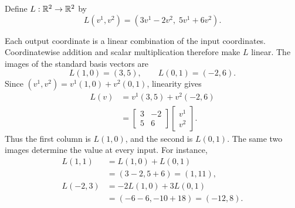 \begin{example}
  \label{ex:linear-algebra-i:coordinate-rule-matrix-columns}
  Define \(L:\mathbb{R}^2\to\mathbb{R}^2\) by
  \[
    L(v^1,v^2)=(3v^1-2v^2,\;5v^1+6v^2).
  \]
  \begin{pendingreview}
  Each output coordinate is a linear combination of the input coordinates.
  Coordinatewise addition and scalar multiplication therefore make \(L\)
  linear.
  The images of the standard basis vectors are
  \[
    L(1,0)=(3,5),\qquad L(0,1)=(-2,6).
  \]
  Since \((v^1,v^2)=v^1(1,0)+v^2(0,1)\), linearity gives
  \[
    \begin{aligned}
      L(v)&=v^1(3,5)+v^2(-2,6)\\
        &=\begin{bmatrix}3&-2\\5&6\end{bmatrix}
          \begin{bmatrix}v^1\\v^2\end{bmatrix}.
    \end{aligned}
  \]
  Thus the first column is \(L(1,0)\), and the second is \(L(0,1)\).
  The same two images determine the value at every input. For instance,
  \[
    \begin{aligned}
      L(1,1)&=L(1,0)+L(0,1)\\
        &=(3-2,5+6)=(1,11),\\
      L(-2,3)&=-2L(1,0)+3L(0,1)\\
        &=(-6-6,-10+18)=(-12,8).
    \end{aligned}
  \]
  \end{pendingreview}
\end{example}

